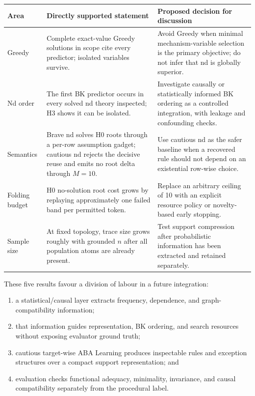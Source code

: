 \documentclass[11pt]{article}
\DeclareRobustCommand{\code}[1]{\texttt{\detokenize{#1}}}
\begin{document}
\begin{longtable}{>{\raggedright\arraybackslash}p{}
>{\raggedright\arraybackslash}p{}
>{\raggedright\arraybackslash}p{}}
\toprule
Area & Directly supported statement & Proposed decision for discussion \\
\midrule
\endhead
Greedy & Complete exact-value Greedy solutions in scope cite every predictor;
isolated variables survive. & Avoid Greedy when minimal mechanism-variable
selection is the primary objective; do not infer that nd is globally superior. \\
\addlinespace
Nd order & The first BK predictor occurs in every solved nd theory inspected;
H3 shows it can be isolated. & Investigate causally or statistically informed
BK ordering as a controlled integration, with leakage and confounding checks. \\
\addlinespace
Semantics & Brave nd solves H0 roots through a per-row assumption gadget;
cautious nd rejects the decisive reuse and emits no root delta through \(M=10\). &
Use cautious nd as the safer baseline when a recovered rule should not depend on
an existential row-wise choice. \\
\addlinespace
Folding budget & H0 no-solution root cost grows by replaying approximately one
failed band per permitted token. & Replace an arbitrary ceiling of 10 with an
explicit resource policy or novelty-based early stopping. \\
\addlinespace
Sample size & At fixed topology, trace size grows roughly with grounded \(n\)
after all population atoms are already present. & Test support compression after
probabilistic information has been extracted and retained separately. \\
\bottomrule
\end{longtable}

These five results favour a division of labour in a future integration:

\begin{enumerate}
  \item a statistical/causal layer extracts frequency, dependence, and graph-
  compatibility information;
  \item that information guides representation, BK ordering, and search
  resources without exposing evaluator ground truth;
  \item cautious target-wise ABA Learning produces inspectable rules and
  exception structures over a compact support representation; and
  \item evaluation checks functional adequacy, minimality, invariance, and
  causal compatibility separately from the procedural \code{solved} label.
\end{enumerate}
\end{document}
